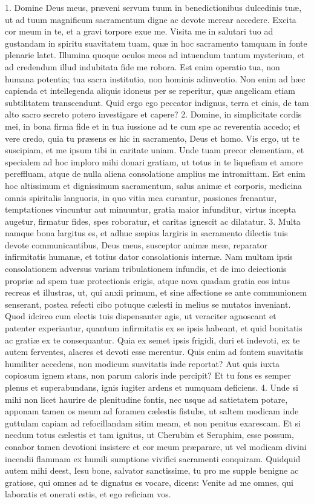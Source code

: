 \documentclass[twoside]{article}
\begin{document}
1. Domine Deus meus, præveni servum tuum in benedictionibus dulcedinis tuæ, ut ad tuum magnificum sacramentum digne ac devote merear accedere. Excita cor meum in te, et a gravi torpore exue me. Visita me in salutari tuo ad gustandam in spiritu suavitatem tuam, quæ in hoc sacramento tamquam in fonte plenarie latet. Illumina quoque oculos meos ad intuendum tantum mysterium, et ad credendum illud indubitata fide me robora. Est enim operatio tua, non humana potentia; tua sacra institutio, non hominis adinventio. Non enim ad hæc capienda et intellegenda aliquis idoneus per se reperitur, quæ angelicam etiam subtilitatem transcendunt. Quid ergo ego peccator indignus, terra et cinis, de tam alto sacro secreto potero investigare et capere?
2. Domine, in simplicitate cordis mei, in bona firma fide et in tua iussione ad te cum spe ac reverentia accedo; et vere credo, quia tu præsens es hic in sacramento, Deus et homo. Vis ergo, ut te suscipiam, et me ipsum tibi in caritate uniam. Unde tuam precor clementiam, et specialem ad hoc imploro mihi donari gratiam, ut totus in te liquefiam et amore pereffluam, atque de nulla aliena consolatione amplius me intromittam. Est enim hoc altissimum et dignissimum sacramentum, salus animæ et corporis, medicina omnis spiritalis languoris, in quo vitia mea curantur, passiones frenantur, temptationes vincuntur aut minuuntur, gratia maior infunditur, virtus incepta augetur, firmatur fides, spes roboratur, et caritas ignescit ac dilatatur.
3. Multa namque bona largitus es, et adhuc sæpius largiris in sacramento dilectis tuis devote communicantibus, Deus meus, susceptor animæ meæ, reparator infirmitatis humanæ, et totius dator consolationis internæ. Nam multam ipsis consolationem adversus variam tribulationem infundis, et de imo deiectionis propriæ ad spem tuæ protectionis erigis, atque nova quadam gratia eos intus recreas et illustras, ut, qui anxii primum, et sine affectione se ante communionem senserant, postea refecti cibo potuque cælesti in melius se mutatos inveniant. Quod idcirco cum electis tuis dispensanter agis, ut veraciter agnoscant et patenter experiantur, quantum infirmitatis ex se ipsis habeant, et quid bonitatis ac gratiæ ex te consequantur. Quia ex semet ipsis frigidi, duri et indevoti, ex te autem ferventes, alacres et devoti esse merentur. Quis enim ad fontem suavitatis humiliter accedens, non modicum suavitatis inde reportat? Aut quis iuxta copiosum ignem stans, non parum caloris inde percipit? Et tu fons es semper plenus et superabundans, ignis iugiter ardens et numquam deficiens.
4. Unde si mihi non licet haurire de plenitudine fontis, nec usque ad satietatem potare, apponam tamen os meum ad foramen cælestis fistulæ, ut saltem modicam inde guttulam capiam ad refocillandam sitim meam, et non penitus exarescam. Et si necdum totus cælestis et tam ignitus, ut Cherubim et Seraphim, esse possum, conabor tamen devotioni insistere et cor meum præparare, ut vel modicam divini incendii flammam ex humili sumptione vivifici sacramenti conquiram. Quidquid autem mihi deest, Iesu bone, salvator sanctissime, tu pro me supple benigne ac gratiose, qui omnes ad te dignatus es vocare, dicens: Venite ad me omnes, qui laboratis et onerati estis, et ego reficiam vos.
\end{document}
